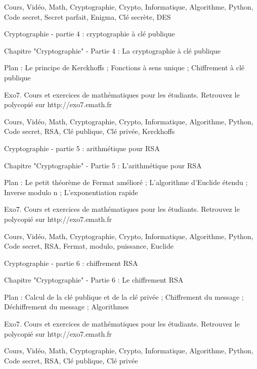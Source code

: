 
Cours, Vidéo, Math, Cryptographie, Crypto,  Informatique, Algorithme, Python, Code secret, 
Secret parfait, Enigma, Clé secrète, DES



Cryptographie - partie 4 : cryptographie à clé publique



Chapitre "Cryptographie" - Partie 4 : La cryptographie à clé publique 

Plan : Le principe de Kerckhoffs ; Fonctions à sens unique ; Chiffrement à clé publique

Exo7. Cours et exercices de mathématiques pour les étudiants.
Retrouvez le polycopié sur http://exo7.emath.fr


Cours, Vidéo, Math, Cryptographie, Crypto,  Informatique, Algorithme, Python, Code secret, 
RSA, Clé publique, Clé privée, Kerckhoffs



Cryptographie - partie 5 : arithmétique pour RSA



Chapitre "Cryptographie" - Partie 5 : L'arithmétique pour RSA

Plan : Le petit théorème de Fermat amélioré ; L'algorithme d'Euclide étendu ;
Inverse modulo n ; L'exponentiation rapide

Exo7. Cours et exercices de mathématiques pour les étudiants.
Retrouvez le polycopié sur http://exo7.emath.fr


Cours, Vidéo, Math, Cryptographie, Crypto,  Informatique, Algorithme, Python, Code secret, RSA, Fermat, modulo,
puissance, Euclide



Cryptographie - partie 6 : chiffrement RSA



Chapitre "Cryptographie" - Partie 6 : Le chiffrement RSA

Plan : Calcul de la clé publique et de la clé privée ; Chiffrement du message ; 
Déchiffrement du message ; Algorithmes

Exo7. Cours et exercices de mathématiques pour les étudiants.
Retrouvez le polycopié sur http://exo7.emath.fr


Cours, Vidéo, Math, Cryptographie, Crypto,  Informatique, Algorithme, Python, Code secret, RSA, Clé publique, Clé privée


